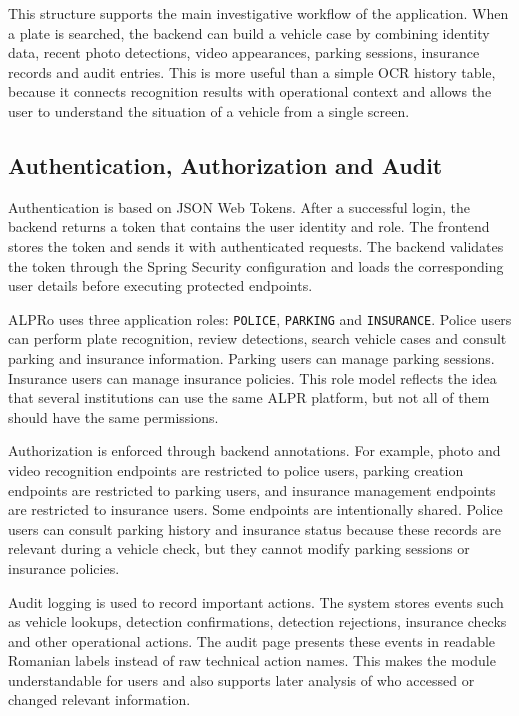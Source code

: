 ﻿\documentclass[12pt,a4paper]{article}
\begin{document}
This structure supports the main investigative workflow of the application. When a plate is searched, the backend can build a vehicle case by combining identity data, recent photo detections, video appearances, parking sessions, insurance records and audit entries. This is more useful than a simple OCR history table, because it connects recognition results with operational context and allows the user to understand the situation of a vehicle from a single screen.

\subsection{Authentication, Authorization and Audit}

Authentication is based on JSON Web Tokens. After a successful login, the backend returns a token that contains the user identity and role. The frontend stores the token and sends it with authenticated requests. The backend validates the token through the Spring Security configuration and loads the corresponding user details before executing protected endpoints.

ALPRo uses three application roles: \texttt{POLICE}, \texttt{PARKING} and \texttt{INSURANCE}. Police users can perform plate recognition, review detections, search vehicle cases and consult parking and insurance information. Parking users can manage parking sessions. Insurance users can manage insurance policies. This role model reflects the idea that several institutions can use the same ALPR platform, but not all of them should have the same permissions.

Authorization is enforced through backend annotations. For example, photo and video recognition endpoints are restricted to police users, parking creation endpoints are restricted to parking users, and insurance management endpoints are restricted to insurance users. Some endpoints are intentionally shared. Police users can consult parking history and insurance status because these records are relevant during a vehicle check, but they cannot modify parking sessions or insurance policies.

Audit logging is used to record important actions. The system stores events such as vehicle lookups, detection confirmations, detection rejections, insurance checks and other operational actions. The audit page presents these events in readable Romanian labels instead of raw technical action names. This makes the module understandable for users and also supports later analysis of who accessed or changed relevant information.
\end{document}
